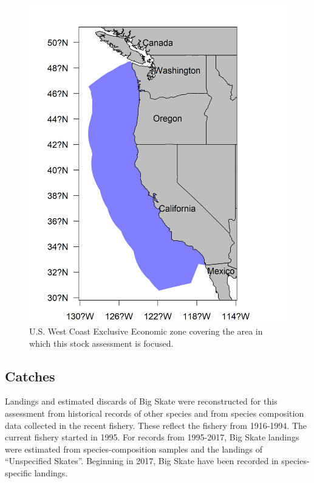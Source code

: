 \documentclass[12pt,]{article}
\begin{document}
\begin{figure}[H]
\begin{centering}
\includegraphics{Figures/assess_region_map.png}
\caption{U.S. West Coast Exclusive Economic zone covering the area in which this stock assessment is focused.}\label{fig:assess_region_map}
\end{centering}
\end{figure}

\hypertarget{catches}{%
\subsection*{Catches}\label{catches}}

Landings and estimated discards of Big Skate were reconstructed for this
assessment from historical records of other species and from species
composition data collected in the recent fishery. These reflect the
fishery from 1916-1994. The current fishery started in 1995. For records
from 1995-2017, Big Skate landings were estimated from
species-composition samples and the landings of ``Unspecified Skates''.
Beginning in 2017, Big Skate have been recorded in species-specific
landings.
\end{document}
